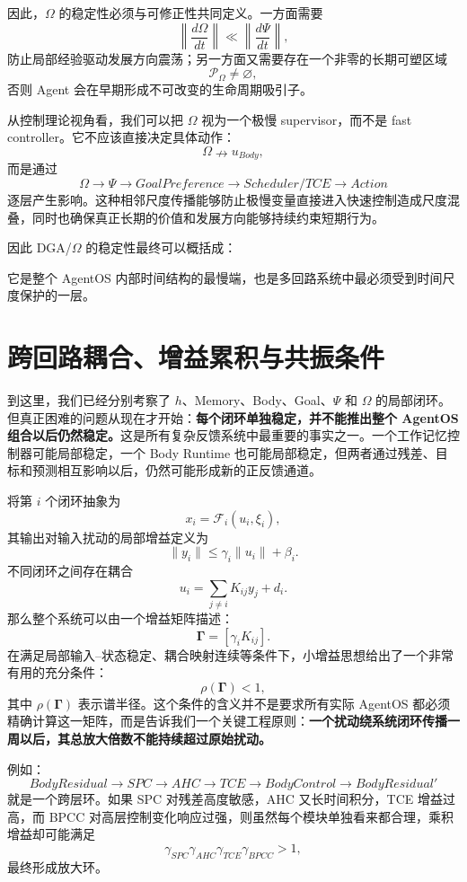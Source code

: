 因此，$\Omega$ 的稳定性必须与可修正性共同定义。一方面需要
\[
\left\|
\frac{d\Omega}{dt}
\right\|
\ll
\left\|
\frac{d\Psi}{dt}
\right\|,
\]
防止局部经验驱动发展方向震荡；另一方面又需要存在一个非零的长期可塑区域
\[
\mathcal P_\Omega
\neq
\varnothing,
\]
否则 Agent 会在早期形成不可改变的生命周期吸引子。

从控制理论视角看，我们可以把 $\Omega$ 视为一个极慢 supervisor，而不是 fast controller。它不应该直接决定具体动作：
\[
\Omega
\nrightarrow
u_{Body},
\]
而是通过
\[
\Omega
\rightarrow
\Psi
\rightarrow
GoalPreference
\rightarrow
Scheduler/TCE
\rightarrow
Action
\]
逐层产生影响。这种相邻尺度传播能够防止极慢变量直接进入快速控制造成尺度混叠，同时也确保真正长期的价值和发展方向能够持续约束短期行为。

因此 DGA/$\Omega$ 的稳定性最终可以概括成：
\begin{statementbox}
\centering
{}
\end{statementbox}
它是整个 AgentOS 内部时间结构的最慢端，也是多回路系统中最必须受到时间尺度保护的一层。

\section{跨回路耦合、增益累积与共振条件}

到这里，我们已经分别考察了 $h$、Memory、Body、Goal、$\Psi$ 和 $\Omega$ 的局部闭环。但真正困难的问题从现在才开始：\textbf{每个闭环单独稳定，并不能推出整个 AgentOS 组合以后仍然稳定。}这是所有复杂反馈系统中最重要的事实之一。一个工作记忆控制器可能局部稳定，一个 Body Runtime 也可能局部稳定，但两者通过残差、目标和预测相互影响以后，仍然可能形成新的正反馈通道。

将第 $i$ 个闭环抽象为
\[
x_i
=
\mathcal F_i(u_i,\xi_i),
\]
其输出对输入扰动的局部增益定义为
\[
\|y_i\|
\leq
\gamma_i\|u_i\|
+
\beta_i.
\]
不同闭环之间存在耦合
\[
u_i
=
\sum_{j\neq i}
K_{ij}y_j+d_i.
\]
那么整个系统可以由一个增益矩阵描述：
\[
\mathbf{\Gamma}
=
\left[
\gamma_iK_{ij}
\right].
\]
在满足局部输入--状态稳定、耦合映射连续等条件下，小增益思想给出了一个非常有用的充分条件：
\[
\boxed{
\rho(\mathbf{\Gamma})<1,
}
\]
其中 $\rho(\mathbf{\Gamma})$ 表示谱半径。这个条件的含义并不是要求所有实际 AgentOS 都必须精确计算这一矩阵，而是告诉我们一个关键工程原则：\textbf{一个扰动绕系统闭环传播一周以后，其总放大倍数不能持续超过原始扰动。}

例如：
\[
BodyResidual
\rightarrow
SPC
\rightarrow
AHC
\rightarrow
TCE
\rightarrow
BodyControl
\rightarrow
BodyResidual'
\]
就是一个跨层环。如果 SPC 对残差高度敏感，AHC 又长时间积分，TCE 增益过高，而 BPCC 对高层控制变化响应过强，则虽然每个模块单独看来都合理，乘积增益却可能满足
\[
\gamma_{SPC}
\gamma_{AHC}
\gamma_{TCE}
\gamma_{BPCC}
>1,
\]
最终形成放大环。

